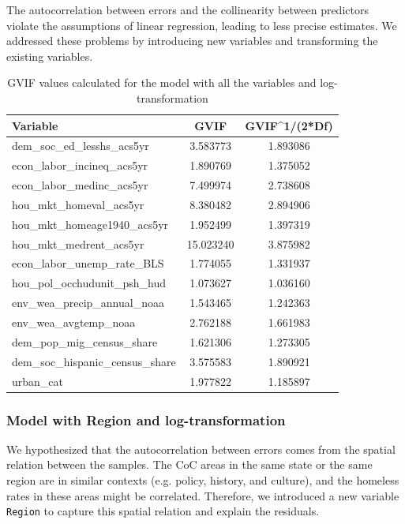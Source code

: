 \documentclass[12pt]{article}
\begin{document}
The autocorrelation between errors and the collinearity between predictors violate the assumptions of linear regression, leading to less precise estimates. We addressed these problems by introducing new variables and transforming the existing variables.

\begin{table}[htp]
\centering
\begin{tabular}{lcc}
\hline
\textbf{Variable} & \textbf{GVIF} & \textbf{GVIF\^{}1/(2*Df)} \\
\hline
dem\_soc\_ed\_lesshs\_acs5yr & 3.583773 & 1.893086 \\
econ\_labor\_incineq\_acs5yr & 1.890769 & 1.375052 \\
econ\_labor\_medinc\_acs5yr & 7.499974 & 2.738608 \\
hou\_mkt\_homeval\_acs5yr & 8.380482 & 2.894906 \\
hou\_mkt\_homeage1940\_acs5yr & 1.952499 & 1.397319 \\
hou\_mkt\_medrent\_acs5yr & 15.023240 & 3.875982 \\
econ\_labor\_unemp\_rate\_BLS & 1.774055 & 1.331937 \\
hou\_pol\_occhudunit\_psh\_hud & 1.073627 & 1.036160 \\
env\_wea\_precip\_annual\_noaa & 1.543465 & 1.242363 \\
env\_wea\_avgtemp\_noaa & 2.762188 & 1.661983 \\
dem\_pop\_mig\_census\_share & 1.621306 & 1.273305 \\
dem\_soc\_hispanic\_census\_share & 3.575583 & 1.890921 \\
urban\_cat & 1.977822 & 1.185897 \\
\hline
\end{tabular}
\caption{GVIF values calculated for the model with all the variables and log-transformation}
\label{tab:gvif}
\end{table}

\subsubsection{Model with Region and log-transformation}

We hypothesized that the autocorrelation between errors comes from the spatial relation between the samples. The CoC areas in the same state or the same region are in similar contexts (e.g. policy, history, and culture), and the homeless rates in these areas might be correlated. Therefore, we introduced a new variable \texttt{Region} to capture this spatial relation and explain the residuals.
\end{document}
